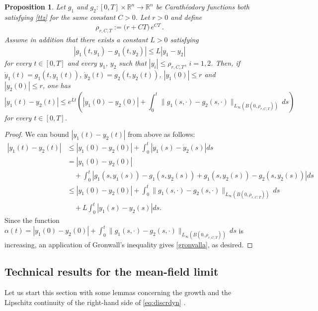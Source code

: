 \documentclass[A4paper,11pt]{article}
\newtheorem{proposition}[theorem]{Proposition}
\theoremstyle{definition}
\newcommand{\R}{\mathbb{R}}
\begin{document}
\begin{proposition}\label{le:uniquecara}
Let $g_1$ and $g_2\colon[0,T]\times \R^n \to \R^n$ be Carath{\'e}odory functions both satisfying \eqref{ttz} for the same  constant $C > 0$. Let $r>0$ and define 
\begin{align*}
\rho_{r, C, T}:=\Big(r+ CT\Big) \,e^{CT}\,.
\end{align*}
Assume in addition that there exists a constant $L > 0$ satisfying
\begin{align*}
|g_1(t, y_1)-g_1(t, y_2)|\le L|y_1-y_2|
\end{align*}
for every $t \in [0, T]$ and every $y_1$, $y_2$ such that $|y_i|\le \rho_{r, C, T}$, $i=1,2$.
Then, if $\dot y_1(t)=g_1(t, y_1(t))$, $\dot y_2(t)=g_2(t, y_2(t))$, $|y_1(0)|\le r$ and $|y_2(0)|\le r$, one has
\begin{equation}\label{gronvalla}
|y_1(t)-y_2(t)|\le e^{Lt}\left(|y_1(0)-y_2(0)|+\int_0^t \|g_1(s, \cdot)-g_2(s, \cdot)\|_{L_\infty(B(0, \rho_{r, C, T}))} \,ds \right)
\end{equation}
for every $t \in [0, T]$.
\end{proposition}
\begin{proof}
We can bound $|y_1(t) - y_2(t)|$ from above as follows:
\begin{align*}
|y_1(t) - y_2(t)| &\leq |y_1(0) - y_2(0)| + \int^t_0 |\dot{y}_1(s) - \dot{y}_2(s)| ds \\
&= |y_1(0) - y_2(0)| \\
& \quad + \int^t_0 |g_1(s, y_1(s)) - g_1(s, y_2(s)) + g_1(s, y_2(s)) - g_2(s, y_2(s))| ds \\
& \leq |y_1(0) - y_2(0)| + \int_0^t \|g_1(s, \cdot)-g_2(s, \cdot)\|_{L_\infty(B(0, \rho_{r, C, T}))} \,ds \\
& \quad  + L \int^t_0|y_1(s) - y_2(s)| ds.
\end{align*}
Since the function $\alpha(t) = |y_1(0) - y_2(0)| + \int_0^t \|g_1(s, \cdot)-g_2(s, \cdot)\|_{L_\infty(B(0, \rho_{r, C, T}))} \,ds$ is increasing, an application of Gronwall's inequality gives \eqref{gronvalla}, as desired.
\end{proof}



\subsection{Technical results for the mean-field limit}\label{ap1}

Let us start this section with some lemmas concerning the growth and the Lipschitz continuity of the right-hand side of  \eqref{eq:discrdyn} .
\end{document}
